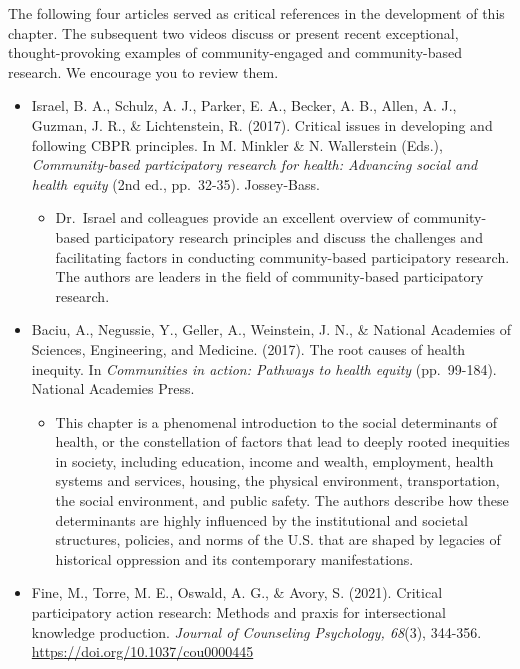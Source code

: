 \documentclass[
  11pt,
]{book}
\providecommand{\tightlist}{%
  \setlength{\itemsep}{0pt}\setlength{\parskip}{0pt}}
\begin{document}
The following four articles served as critical references in the development of this chapter. The subsequent two videos discuss or present recent exceptional, thought-provoking examples of community-engaged and community-based research. We encourage you to review them.

\begin{itemize}
\tightlist
\item
  Israel, B. A., Schulz, A. J., Parker, E. A., Becker, A. B., Allen, A. J., Guzman, J. R., \& Lichtenstein, R. (2017). Critical issues in developing and following CBPR principles. In M. Minkler \& N. Wallerstein (Eds.), \emph{Community-based participatory research for health: Advancing social and health equity} (2nd ed., pp.~32-35). Jossey-Bass.

  \begin{itemize}
  \tightlist
  \item
    Dr.~Israel and colleagues provide an excellent overview of community-based participatory research principles and discuss the challenges and facilitating factors in conducting community-based participatory research. The authors are leaders in the field of community-based participatory research.
  \end{itemize}
\item
  Baciu, A., Negussie, Y., Geller, A., Weinstein, J. N., \& National Academies of Sciences, Engineering, and Medicine. (2017). The root causes of health inequity. In \emph{Communities in action: Pathways to health equity} (pp.~99-184). National Academies Press.

  \begin{itemize}
  \tightlist
  \item
    This chapter is a phenomenal introduction to the social determinants of health, or the constellation of factors that lead to deeply rooted inequities in society, including education, income and wealth, employment, health systems and services, housing, the physical environment, transportation, the social environment, and public safety. The authors describe how these determinants are highly influenced by the institutional and societal structures, policies, and norms of the U.S. that are shaped by legacies of historical oppression and its contemporary manifestations.
  \end{itemize}
\item
  Fine, M., Torre, M. E., Oswald, A. G., \& Avory, S. (2021). Critical participatory action research: Methods and praxis for intersectional knowledge production. \emph{Journal of Counseling Psychology, 68}(3), 344-356. \url{https://doi.org/10.1037/cou0000445}


\end{itemize}
\end{document}
